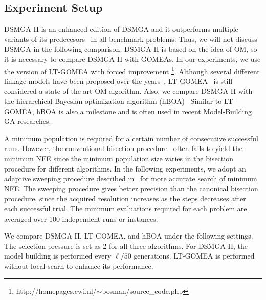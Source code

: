 \documentclass{sig-alternate-05-2015}
\begin{document}
\subsection{Experiment Setup}
DSMGA-II is an enhanced edition of DSMGA and it outperforms multiple variants of its predecesors~\cite{yu:DSMGA} in all benchmark problems. 
Thus, we will not discuss DSMGA in the following comparison.
DSMGA-II is based on the idea of OM, so it is necessary to compare DSMGA-II with GOMEAs. 
In our experiments, we use the version of LT-GOMEA with forced improvement \footnote{http://homepages.cwi.nl/$\sim$bosman/source\_code.php}.
Although several different linkage models have been proposed over the years~\cite{bosman:robust}, LT-GOMEA~\cite{bosman:LT-GOMEA} is still considered a state-of-the-art OM algorithm.
Also, we compare DSMGA-II with the hierarchical Bayesian optimization algorithm (hBOA)~\cite{pelikan:hBOA}
Similar to LT-GOMEA, hBOA is also a milestone and is often used in recent Model-Building GA researches.


A minimum population is required for a certain number of consecutive successful runs.
However, the conventional bisection procedure~\cite{pelikan:hBOA} often fails to yield the minimum NFE  since the minimum population size varies in the bisection procedure for different algorithms.
In the following experiments, we adopt an adaptive sweeping procedure described in~\cite{hsu:DSMGA2} for more accurate search of minimum NFE.
The sweeping procedure gives better precision than the canonical bisection procedure, since the acquired resolution increases as the steps decreases after each successful trial.
The minimum evaluations required for each problem are averaged over 100 independent runs or instances.

We compare DSMGA-II, LT-GOMEA, and hBOA under the following settings. 
The selection pressure is set as 2 for all three algorithms. 
For DSMGA-II, the model building is performed every $\ell/50$ generations.
LT-GOMEA is performed without local searh to enhance its performance.%
\end{document}
